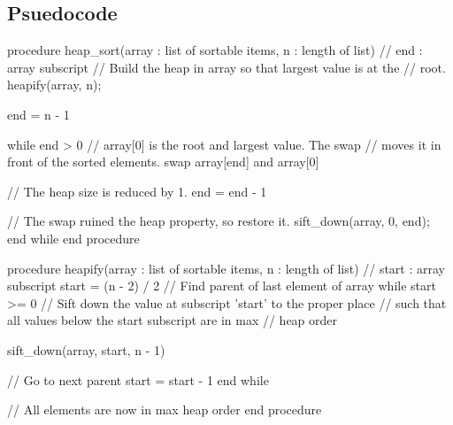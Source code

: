 \documentclass{report}
\begin{document}
    \subsection{Psuedocode}
    \bigbreak \noindent 
    \begin{cppcode}
procedure heap_sort(array : list of sortable items, n : length of list)
    // end : array subscript
    // Build the heap in array so that largest value is at the
    // root.
    heapify(array, n);

    end = n - 1

    while end > 0
        // array[0] is the root and largest value. The swap
        // moves it in front of the sorted elements.
        swap array[end] and array[0]

        // The heap size is reduced by 1.
        end = end - 1

        // The swap ruined the heap property, so restore it.
        sift_down(array, 0, end);
    end while
end procedure

procedure heapify(array : list of sortable items, n : length of list)
    // start : array subscript
    start = (n - 2) / 2 // Find parent of last element of array
    while start >= 0
        // Sift down the value at subscript 'start' to the proper place
        // such that all values below the start subscript are in max
        // heap order

        sift_down(array, start, n - 1)

        // Go to next parent
        start = start - 1
    end while

    // All elements are now in max heap order
end procedure
    \end{cppcode}
\end{document}

